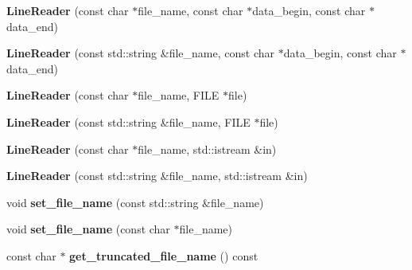 \begin{DoxyCompactItemize}
\item 
{\bfseries Line\+Reader} (const char $\ast$file\+\_\+name, const char $\ast$data\+\_\+begin, const char $\ast$data\+\_\+end)\hypertarget{classio_1_1_line_reader_ad5a65d6f23474884061a77ea858c042b}{}\label{classio_1_1_line_reader_ad5a65d6f23474884061a77ea858c042b}

\item 
{\bfseries Line\+Reader} (const std\+::string \&file\+\_\+name, const char $\ast$data\+\_\+begin, const char $\ast$data\+\_\+end)\hypertarget{classio_1_1_line_reader_a0a52d864b46442a253443cac1367366e}{}\label{classio_1_1_line_reader_a0a52d864b46442a253443cac1367366e}

\item 
{\bfseries Line\+Reader} (const char $\ast$file\+\_\+name, F\+I\+LE $\ast$file)\hypertarget{classio_1_1_line_reader_ad2a8943ba0848ae5052e2f5ad30c010e}{}\label{classio_1_1_line_reader_ad2a8943ba0848ae5052e2f5ad30c010e}

\item 
{\bfseries Line\+Reader} (const std\+::string \&file\+\_\+name, F\+I\+LE $\ast$file)\hypertarget{classio_1_1_line_reader_a93fa2e3ae98b0e7a7391714d6395c552}{}\label{classio_1_1_line_reader_a93fa2e3ae98b0e7a7391714d6395c552}

\item 
{\bfseries Line\+Reader} (const char $\ast$file\+\_\+name, std\+::istream \&in)\hypertarget{classio_1_1_line_reader_a301c08eb9ca5d3fdccf4e9a8e5ac82f8}{}\label{classio_1_1_line_reader_a301c08eb9ca5d3fdccf4e9a8e5ac82f8}

\item 
{\bfseries Line\+Reader} (const std\+::string \&file\+\_\+name, std\+::istream \&in)\hypertarget{classio_1_1_line_reader_a3eacf4d1539a24122c6897fce4e72f06}{}\label{classio_1_1_line_reader_a3eacf4d1539a24122c6897fce4e72f06}

\item 
void {\bfseries set\+\_\+file\+\_\+name} (const std\+::string \&file\+\_\+name)\hypertarget{classio_1_1_line_reader_a1a0763d491dec16cebc33134e965dfee}{}\label{classio_1_1_line_reader_a1a0763d491dec16cebc33134e965dfee}

\item 
void {\bfseries set\+\_\+file\+\_\+name} (const char $\ast$file\+\_\+name)\hypertarget{classio_1_1_line_reader_a81c56ac68497da5ec874333ce063fd83}{}\label{classio_1_1_line_reader_a81c56ac68497da5ec874333ce063fd83}

\item 
const char $\ast$ {\bfseries get\+\_\+truncated\+\_\+file\+\_\+name} () const \hypertarget{classio_1_1_line_reader_a4a0ea19065c0092e7fc68c4ccbd815b1}{}\label{classio_1_1_line_reader_a4a0ea19065c0092e7fc68c4ccbd815b1}


\end{DoxyCompactItemize}

